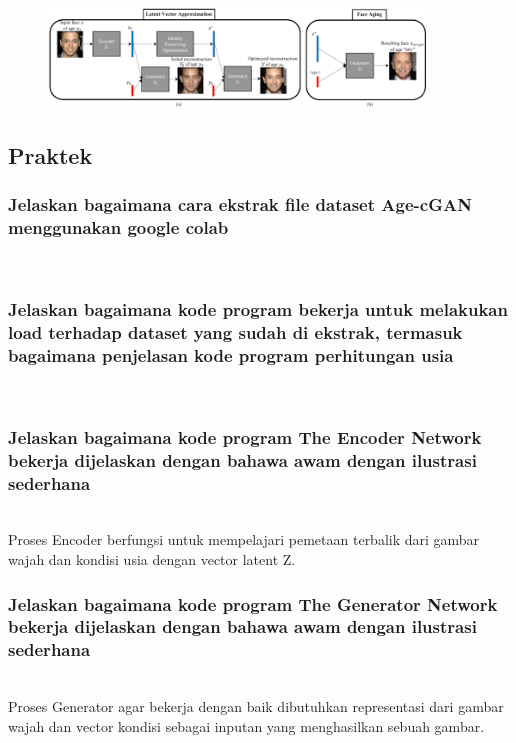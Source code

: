 	\begin{figure}[H]
		\begin{center}
		 \includegraphics[width=10cm]{figures/1174076/figures9/teori11.png}
		 \caption{}	
		\end{center}
	\end{figure}
	
\subsection{Praktek}
 
	\subsubsection{Jelaskan bagaimana cara ekstrak file dataset Age-cGAN menggunakan google colab}
	\hfill\\
		


	\subsubsection{Jelaskan bagaimana kode program bekerja untuk melakukan load terhadap dataset yang sudah di ekstrak, termasuk bagaimana penjelasan kode program perhitungan usia}
	\hfill\\

		


	\subsubsection{Jelaskan bagaimana kode program The Encoder Network bekerja dijelaskan dengan bahawa awam dengan ilustrasi sederhana}
	\hfill\\
	Proses Encoder berfungsi untuk mempelajari pemetaan terbalik dari gambar wajah dan kondisi usia dengan vector latent Z.

			

	
	\subsubsection{Jelaskan bagaimana kode program The Generator Network bekerja dijelaskan dengan bahawa awam dengan ilustrasi sederhana}
	\hfill\\
	Proses Generator agar bekerja dengan baik dibutuhkan representasi dari gambar wajah dan vector kondisi sebagai inputan yang menghasilkan sebuah gambar.

